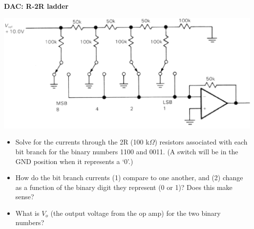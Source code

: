 \item {\bf DAC: R-2R ladder} 

\begin{center}
\includegraphics[width=0.75\linewidth]{DAC_R-2R/R-2R_DAC.eps}
\end{center}

\begin{itemize}
\item Solve for the currents through the 2R (100 k$\Omega$) resistors
associated with each bit branch for the binary numbers 1100 and 0011.  (A
switch will be in the GND position when it represents a `0'.)

\item How do the bit branch currents (1) compare to one another, and (2) change as a
function of the binary digit they represent (0 or 1)?  Does this make sense?

\item What is $V_o$ (the output voltage from the op amp) for the two binary numbers?
\end{itemize}
